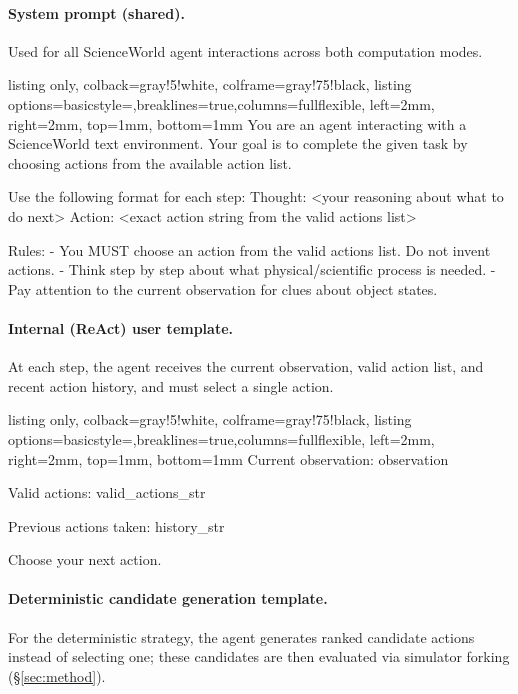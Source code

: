 \documentclass[11pt]{article}
\begin{document}
\paragraph{System prompt (shared).} Used for all ScienceWorld agent interactions across both computation modes.

\begin{tcblisting}{listing only, colback=gray!5!white, colframe=gray!75!black,
  listing options={basicstyle=\small\ttfamily,breaklines=true,columns=fullflexible},
  left=2mm, right=2mm, top=1mm, bottom=1mm}
You are an agent interacting with a ScienceWorld text
environment. Your goal is to complete the given task by
choosing actions from the available action list.

Use the following format for each step:
Thought: <your reasoning about what to do next>
Action: <exact action string from the valid actions list>

Rules:
- You MUST choose an action from the valid actions list.
  Do not invent actions.
- Think step by step about what physical/scientific
  process is needed.
- Pay attention to the current observation for clues
  about object states.
\end{tcblisting}

\paragraph{Internal (ReAct) user template.} At each step, the agent receives the current observation, valid action list, and recent action history, and must select a single action.

\begin{tcblisting}{listing only, colback=gray!5!white, colframe=gray!75!black,
  listing options={basicstyle=\small\ttfamily,breaklines=true,columns=fullflexible},
  left=2mm, right=2mm, top=1mm, bottom=1mm}
Current observation:
{observation}

Valid actions:
{valid_actions_str}

Previous actions taken: {history_str}

Choose your next action.
\end{tcblisting}

\paragraph{Deterministic candidate generation template.} For the deterministic strategy, the agent generates ranked candidate actions instead of selecting one; these candidates are then evaluated via simulator forking (\S\ref{sec:method}).
\end{document}
